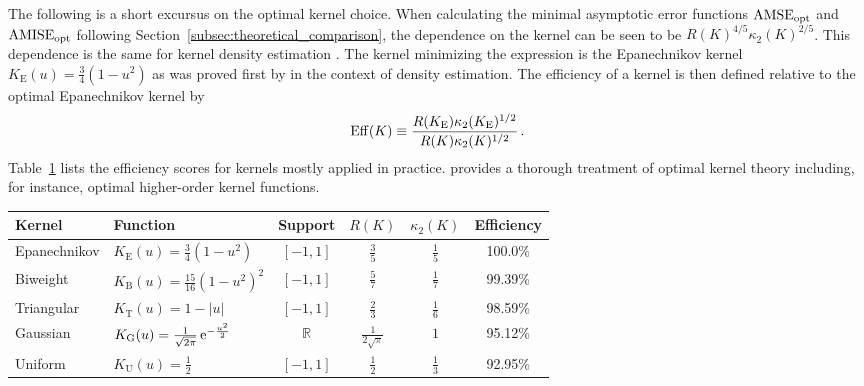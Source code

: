 The following is a short excursus on the optimal kernel choice.
When calculating the minimal asymptotic error functions $\operatorname{AMSE}_{\text{opt}}$ and $\operatorname{AMISE}_{\text{opt}}$ following Section~\ref{subsec:theoretical_comparison}, the dependence on the kernel can be seen to be $R(K)^{4/5} \kappa_2(K)^{2/5}$.
This dependence is the same for kernel density estimation \parencite[49]{Müller_1988}.
The kernel minimizing the expression is the Epanechnikov kernel $K_\text{E}(u) = \frac{3}{4}(1 - u^2)$ as was proved first by \textcite{Epanechnikov_1969} in the context of density estimation.
The efficiency of a kernel is then defined relative to the optimal Epanechnikov kernel by 
\begin{equation}
	\operatorname{Eff}(K) \equiv \frac{R(K_{\text{E}}) \kappa_2(K_{\text{E}})^{1/2}}{R(K) \kappa_2(K)^{1/2}} \,.
\end{equation}
Table~\ref{tab:kernels} lists the efficiency scores for kernels mostly applied in practice.
\textcite[Section~5]{Müller_1988} provides a thorough treatment of optimal kernel theory including, for instance, optimal higher-order kernel functions.
\vfill
\renewcommand{\arraystretch}{1.4}	
\begin{table}[h]
	\centering
	\label{tab:kernels}
	\begin{tabular}{l l c c c c}  
		\toprule
		Kernel & Function & Support & $R(K)$ & $\kappa_2(K)$ & Efficiency \\
		\midrule
		Epanechnikov & $K_\text{E}(u) = \frac{3}{4}(1 - u^2)$                     & $[-1, 1]$    & $\frac{3}{5}$           & $\frac{1}{5}$ & 100.0\% \\
		Biweight     & $K_\text{B}(u) = \frac{15}{16}{(1 - u^2)}^2$               & $[-1, 1]$    & $\frac{5}{7}$           & $\frac{1}{7}$ & 99.39\% \\
		Triangular   & $K_\text{T}(u) = 1 - |u|$                                  & $[-1, 1]$    & $\frac{2}{3}$           & $\frac{1}{6}$ & 98.59\% \\
		Gaussian     & $K_\text{G}(u) = \frac{1}{\sqrt{2\pi}}\operatorname{e}^{-\frac{u^2}{2}}$ & $\mathbb{R}$ & $\frac{1}{2\sqrt{\pi}}$ & $1$           & 95.12\% \\
		Uniform      & $K_\text{U}(u) = \frac{1}{2}$                              & $[-1, 1]$    & $\frac{1}{2}$           & $\frac{1}{3}$ & 92.95\% \\
		\bottomrule
	\end{tabular}	
\end{table}
\renewcommand{\arraystretch}{1.0}
